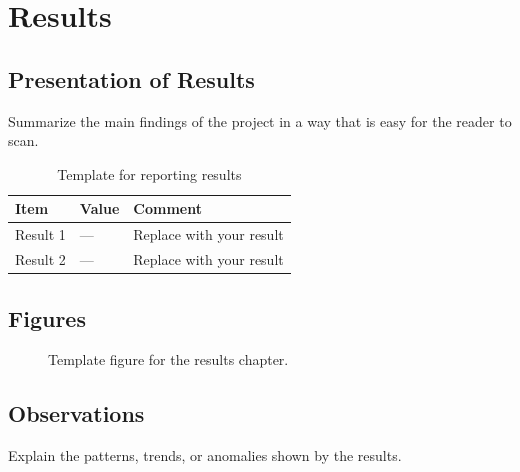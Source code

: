 \chapter{Results}

\section{Presentation of Results}

Summarize the main findings of the project in a way that is easy for the reader to scan.

\begin{table}[h!]
\centering
\caption{Template for reporting results}
\label{tab:results-template}
\begin{tabular}{lll}
\toprule
Item & Value & Comment \\
\midrule
Result 1 & --- & Replace with your result \\
Result 2 & --- & Replace with your result \\
\bottomrule
\end{tabular}
\end{table}

\section{Figures}

\begin{figure}[h!]
\centering
{}
\caption{Template figure for the results chapter.}
\label{fig:results-template}
\end{figure}

\section{Observations}

Explain the patterns, trends, or anomalies shown by the results.
